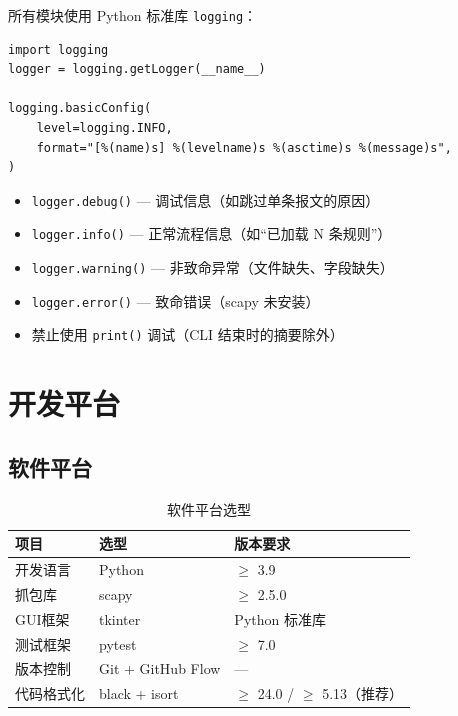 \documentclass[12pt,a4paper]{ctexart}
\begin{document}
所有模块使用 Python 标准库 \texttt{logging}：

\begin{lstlisting}
import logging
logger = logging.getLogger(__name__)

logging.basicConfig(
    level=logging.INFO,
    format="[%(name)s] %(levelname)s %(asctime)s %(message)s",
)
\end{lstlisting}

\begin{itemize}[nosep]
    \item \texttt{logger.debug()} — 调试信息（如跳过单条报文的原因）
    \item \texttt{logger.info()} — 正常流程信息（如``已加载 N 条规则''）
    \item \texttt{logger.warning()} — 非致命异常（文件缺失、字段缺失）
    \item \texttt{logger.error()} — 致命错误（scapy 未安装）
    \item 禁止使用 \texttt{print()} 调试（CLI 结束时的摘要除外）
\end{itemize}

\section{开发平台}

\subsection{软件平台}

\begin{table}[H]
\centering
\caption{软件平台选型}
\begin{tabular}{@{}lll@{}}
\toprule
项目 & 选型 & 版本要求 \\
\midrule
开发语言   & Python                 & $\ge$ 3.9 \\
抓包库     & scapy                  & $\ge$ 2.5.0 \\
GUI框架    & tkinter                & Python 标准库 \\
测试框架   & pytest                 & $\ge$ 7.0 \\
版本控制   & Git + GitHub Flow      & — \\
代码格式化 & black + isort          & $\ge$ 24.0 / $\ge$ 5.13（推荐） \\
\bottomrule
\end{tabular}
\end{table}
\end{document}
